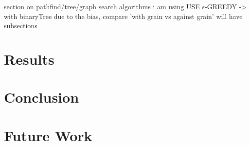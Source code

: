 \documentclass[conference]{IEEEtran}
\begin{document}
section on pathfind/tree/graph search algorithms i am using
\MakeUppercase{ USE $\epsilon$-greedy}%
-> with binaryTree due to the bias, compare 'with grain vs against grain'
will have subsections
\section{Results}

\section{Conclusion}

\section{Future Work}


\printbibliography
\end{document}
